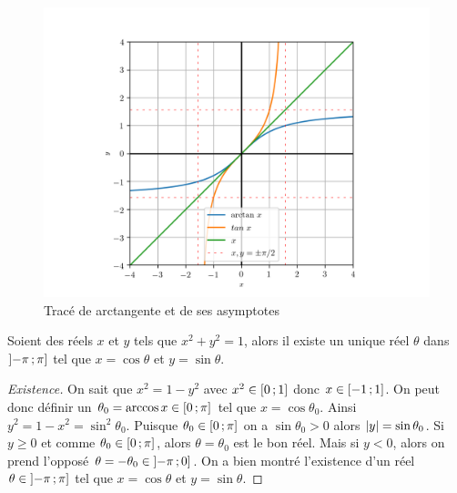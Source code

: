\begin{figure}
    \centering
    \includegraphics[scale=0.8]{arctan.png}
    \caption{Tracé de arctangente et de ses asymptotes}
    \label{fig:tracearctangente}
\end{figure}
\newpage
\begin{theo}
    \label{chap1-theo:thetasin}
    Soient des réels \(x\) et \(y\) tels que \(x^2+y^2=1\), alors il existe un 
    unique réel \(\theta\) dans \(\left] -\pi \, ;  \pi \right]\) tel que \(x=\cos 
    \theta\) et \(y=\sin \theta\).
\end{theo}
\begin{proof}[Existence]
    On sait que \(x^2=1-y^2\) avec \(x^2 \in \left[ 0 \, ;  1 \right]\) donc \(x \in 
    \left[ -1 \, ;  1 \right]\). On peut donc définir un \(\theta_0=\arccos x \in 
    \left[ 0 \, ;  \pi \right]\) tel que \(x=\cos \theta_0\). Ainsi 
    \(y^2=1-x^2=\sin^2 \theta_0\). Puisque \(\theta_0 \in 
    \left[ 0 \, ;  \pi \right]\) on a \(\sin \theta_0>0\) alors \(\left\lvert y\right\rvert=\sin 
    \theta_0\).
    Si \(y \geqslant 0\) et comme \(\theta_0 \in \left[ 0 \, ;  \pi \right]\), alors 
    \(\theta=\theta_0\) est le bon réel.
    Mais si \(y<0\), alors on prend l'opposé \(\theta=-\theta_0 \in 
    \left] -\pi \, ;  0 \right]\).
    On a bien montré l'existence d'un réel \(\theta \in 
    \left] -\pi \, ;  \pi \right]\) tel que \(x=\cos \theta\) et \(y=\sin \theta\).
\end{proof}
